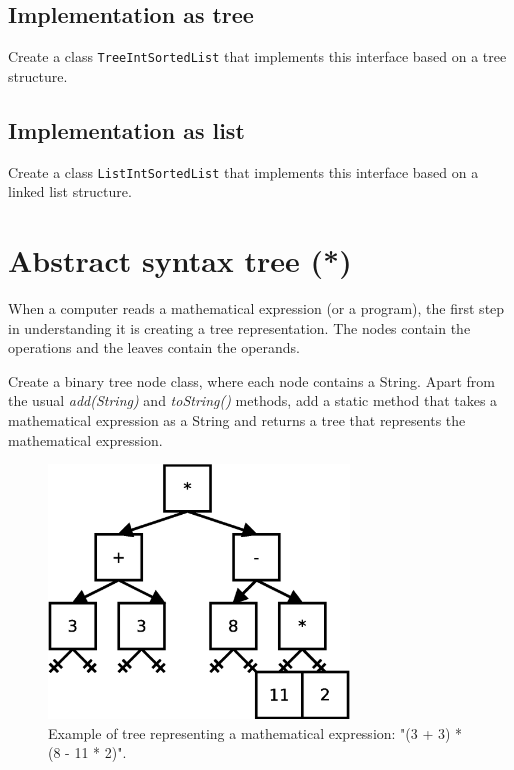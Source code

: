 \documentclass{article}
\begin{document}
\subsection{Implementation as tree}
\label{sec:impl-as-tree}

Create a class \verb+TreeIntSortedList+ that implements this interface based
on a tree structure. 

\subsection{Implementation as list}
\label{sec:impl-as-list}

Create a class \verb+ListIntSortedList+ that implements this interface based
on a linked list structure. 


\section{Abstract syntax tree (*)}
\label{sec:abstract-tree-}

When a computer reads a mathematical expression (or a program), the
first step in understanding it is creating a tree representation. The
nodes contain the operations and the leaves contain the operands. 

Create a binary tree node class, where each node contains a
String. Apart from the usual \emph{add(String)} and \emph{toString()}
methods, add a static method that takes a mathematical expression as a
String and returns a tree that represents the mathematical
expression. 

\begin{figure}[hbtp]
  \centering
  \includegraphics[width=8cm]{gfx/tree-operation}
  \caption{Example of tree representing a mathematical expression: "(3 + 3) * (8 - 11 * 2)".}
  \label{fig:jjgg}
\end{figure}
\end{document}
